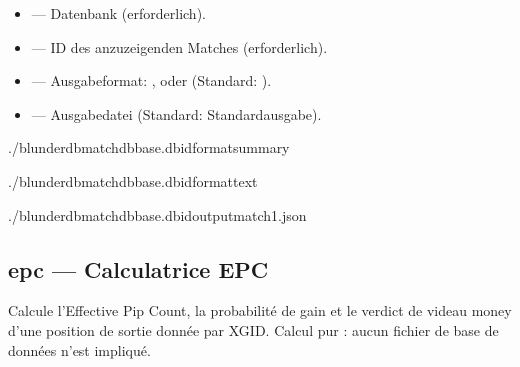 \documentclass[letterpaper,10pt,german]{sphinxmanual}
\begin{document}
\sphinxAtStartPar
{}
\begin{itemize}
\item {} 
\sphinxAtStartPar
{} — Datenbank (erforderlich).

\item {} 
\sphinxAtStartPar
{} — ID des anzuzeigenden Matches (erforderlich).

\item {} 
\sphinxAtStartPar
{} — Ausgabeformat: ,  oder  (Standard: ).

\item {} 
\sphinxAtStartPar
{} — Ausgabedatei (Standard: Standardausgabe).

\end{itemize}

\sphinxAtStartPar
{}

\begin{sphinxVerbatim}[commandchars=\\\{\}]
./blunderdbmatch\PYGZhy{}\PYGZhy{}dbbase.db\PYGZhy{}\PYGZhy{}id\PYGZhy{}\PYGZhy{}formatsummary

./blunderdbmatch\PYGZhy{}\PYGZhy{}dbbase.db\PYGZhy{}\PYGZhy{}id\PYGZhy{}\PYGZhy{}formattext

./blunderdbmatch\PYGZhy{}\PYGZhy{}dbbase.db\PYGZhy{}\PYGZhy{}id\PYGZhy{}\PYGZhy{}outputmatch1.json
\end{sphinxVerbatim}


\subsection{epc — Calculatrice EPC}
\label{\detokenize{cli:epc-calculatrice-epc}}
\sphinxAtStartPar
Calcule l’Effective Pip Count, la probabilité de gain et le verdict de videau
money d’une position de sortie donnée par XGID. Calcul pur : aucun fichier de
base de données n’est impliqué.
\end{document}

